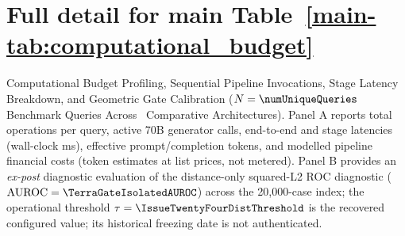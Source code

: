 \clearpage
\section{Full detail for main Table~\ref{main-tab:computational_budget}}
\label{detail-tab:computational_budget}
Computational Budget Profiling, Sequential Pipeline Invocations, Stage Latency Breakdown, and Geometric Gate Calibration ($N=\numUniqueQueries$ Benchmark Queries Across \numComparativePipelines\ Comparative Architectures). Panel A reports total operations per query, active 70B generator calls, end-to-end and stage latencies (wall-clock ms), effective prompt/completion tokens, and modelled pipeline financial costs (token estimates at list prices, not metered). Panel B provides an \textit{ex-post} diagnostic evaluation of the distance-only squared-L2 ROC diagnostic ($\text{AUROC} = \TerraGateIsolatedAUROC$) across the 20,000-case index; the operational threshold $\tau=\IssueTwentyFourDistThreshold$ is the recovered configured value; its historical freezing date is not authenticated.\par\medskip
